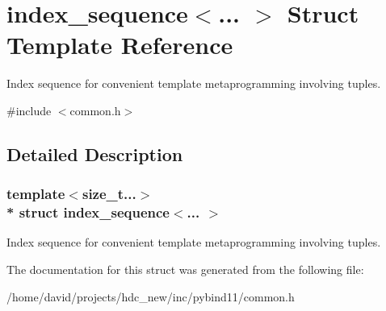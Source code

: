 \hypertarget{structindex__sequence}{}\section{index\+\_\+sequence$<$... $>$ Struct Template Reference}
\label{structindex__sequence}


Index sequence for convenient template metaprogramming involving tuples.  




{\ttfamily \#include $<$common.\+h$>$}



\subsection{Detailed Description}
\subsubsection*{template$<$size\+\_\+t...$>$\\*
struct index\+\_\+sequence$<$... $>$}

Index sequence for convenient template metaprogramming involving tuples. 

The documentation for this struct was generated from the following file\+:\begin{DoxyCompactItemize}
\item 
/home/david/projects/hdc\+\_\+new/inc/pybind11/common.\+h\end{DoxyCompactItemize}
